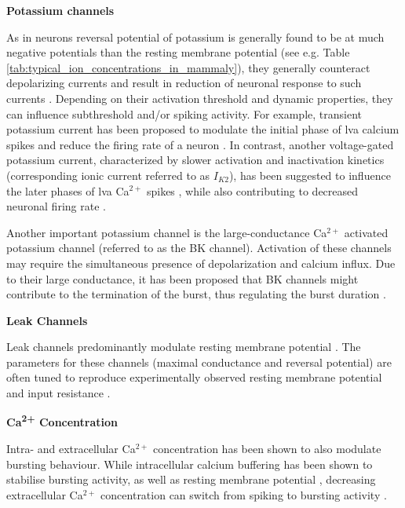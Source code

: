 \documentclass[../main.tex]{subfiles}
\begin{document}
\noindent\textbf{Potassium channels}

As in neurons reversal potential of potassium is generally found to be at much negative potentials than the resting membrane potential (see e.g. Table \ref{tab:typical_ion_concentrations_in_mammaly}), they generally counteract depolarizing currents and result in reduction of neuronal response to such currents \parencite{mccormickModelElectrophysiologicalProperties1992}. Depending on their activation threshold and dynamic properties, they can influence subthreshold and/or spiking activity. For example, transient potassium current has been proposed to modulate the initial phase of \gls{lva} calcium spikes \parencite{huguenardSimulationCurrentsInvolved1992} and reduce the firing rate of a neuron \parencite{mccormickModelElectrophysiologicalProperties1992}. In contrast, another voltage-gated potassium current, characterized by slower activation and inactivation kinetics (corresponding ionic current referred to as $I_{K2}$), has been suggested to influence the later phases of \gls{lva} Ca$^{2+}$ spikes \parencite{huguenardSimulationCurrentsInvolved1992}, while also contributing to decreased neuronal firing rate \parencite{mccormickModelElectrophysiologicalProperties1992}.

Another important potassium channel is the large-conductance Ca$^{2+}$ activated potassium channel (referred to as the BK channel). Activation of these channels may require the simultaneous presence of depolarization and calcium influx. Due to their large conductance, it has been proposed that BK channels might contribute to the termination of the burst, thus regulating the burst
duration \parencite{liuMultipleConductancesCooperatively2008}.

\noindent\textbf{Leak Channels}

Leak channels predominantly modulate resting membrane potential \parencite{mccormickModelElectrophysiologicalProperties1992,amarilloInterplaySevenSubthreshold2014}. The parameters for these channels (maximal conductance and reversal potential) are often tuned to reproduce experimentally observed resting membrane potential and input resistance \parencite{wangMultipleDynamicalModes1994}.

\noindent \textbf{Ca\textsuperscript{2+} Concentration}

Intra- and extracellular Ca$^{2+}$ concentration has been shown to also modulate bursting behaviour. While intracellular calcium buffering has been shown to stabilise bursting activity, as well as resting membrane potential \parencite{liuMultipleConductancesCooperatively2008}, decreasing extracellular Ca$^{2+}$ concentration can switch from spiking to bursting activity \parencite{golombContributionPersistentNa2006}.
\end{document}

